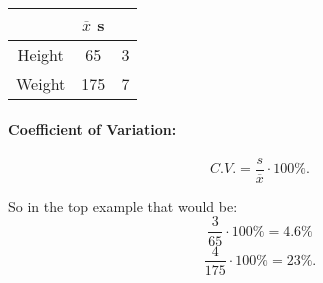 \documentclass{book}
\begin{document}
\begin{table}[htbp]
    \centering
    \begin{tabular}{c|c|c}
        \toprule
        & $\overline{x}$ s \\
        \midrule
        Height & 65 & 3 \\
        \midrule
        Weight & 175 & 7 \\
        \bottomrule
    \end{tabular}
\end{table}

\paragraph{Coefficient of Variation:}
\[ C.V. = \frac{s}{\overline{x}}\cdot 100\% .\] 

So in the top example that would be:
\[\frac{3}{65}\cdot 100\% = 4.6\% \]
\[\frac{4}{175}\cdot 100\% = 23\% .\] 


\end{document}
